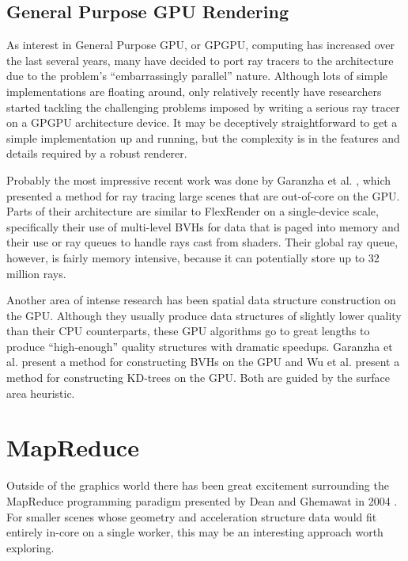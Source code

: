 \documentclass[12pt]{ucthesis}
\begin{document}
\subsection{General Purpose GPU Rendering}
\label{gpgpu}

As interest in General Purpose GPU, or GPGPU, computing has increased over
the last several years, many have decided to port ray tracers to the
architecture due to the problem's ``embarrassingly parallel'' nature. Although
lots of simple implementations are floating around, only relatively recently
have researchers started tackling the challenging problems imposed by writing
a serious ray tracer on a GPGPU architecture device. It may be deceptively
straightforward to get a simple implementation up and running, but the
complexity is in the features and details required by a robust renderer.

Probably the most impressive recent work was done by Garanzha et al.
\cite{garanzha:2011:ray}, which presented a method for ray tracing large scenes that
are out-of-core on the GPU. Parts of their architecture are similar to FlexRender
on a single-device scale, specifically their use of multi-level BVHs for data that
is paged into memory and their use or ray queues to handle rays cast from shaders.
Their global ray queue, however, is fairly memory intensive, because it can
potentially store up to 32 million rays.

Another area of intense research has been spatial data structure construction
on the GPU. Although they usually produce data structures of slightly lower
quality than their CPU counterparts, these GPU algorithms go to great lengths
to produce ``high-enough'' quality structures with dramatic speedups. Garanzha
et al. \cite{garanzha:2011:bvh} present a method for constructing BVHs on the
GPU and Wu et al. \cite{wu:2011} present a method for constructing KD-trees on
the GPU. Both are guided by the surface area heuristic.

\section{MapReduce}
\label{mapreduce}

Outside of the graphics world there has been great excitement surrounding
the MapReduce programming paradigm presented by Dean and Ghemawat in 2004
\cite{dean:2004}. For smaller scenes whose geometry and acceleration structure
data would fit entirely in-core on a single worker, this may be an interesting
approach worth exploring.
\end{document}
